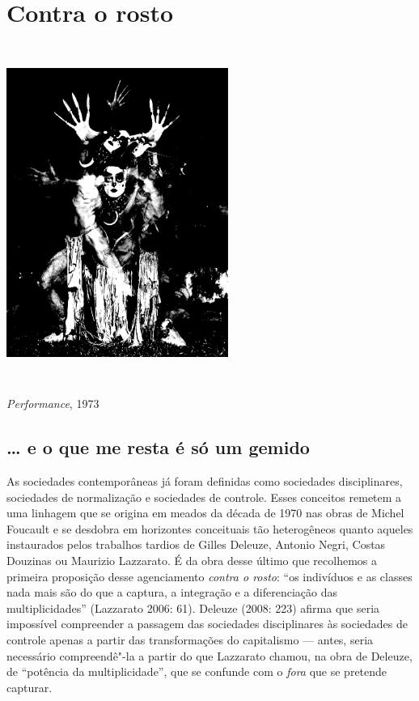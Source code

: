 \chapter{Contra o rosto}

\begin{center}
\centering\includegraphics[width=7.245cm,height=11.019cm]{Imgs/img5.jpg}

\emph{Performance}, 1973
\end{center}

\section{\ldots{} e o que me resta é só um gemido}

As sociedades contemporâneas já foram definidas como sociedades
disciplinares, sociedades de normalização e sociedades de controle.
Esses conceitos remetem a uma linhagem que se origina em meados da
década de 1970 nas obras de Michel Foucault e se desdobra em horizontes
conceituais tão heterogêneos quanto aqueles instaurados pelos trabalhos
tardios de Gilles Deleuze, Antonio Negri, Costas Douzinas ou Maurizio
Lazzarato. É da obra desse último que recolhemos a primeira proposição
desse agenciamento \emph{contra o rosto}: ``os indivíduos e as classes
nada mais são do que a captura, a integração e a diferenciação das
multiplicidades'' (Lazzarato 2006: 61). Deleuze (2008: 223) afirma que
seria impossível compreender a passagem das sociedades disciplinares às
sociedades de controle apenas a partir das transformações do capitalismo
--- antes, seria necessário compreendê"-la a partir do que Lazzarato
chamou, na obra de Deleuze, de ``potência da multiplicidade'', que se
confunde com o \emph{fora} que se pretende capturar.

